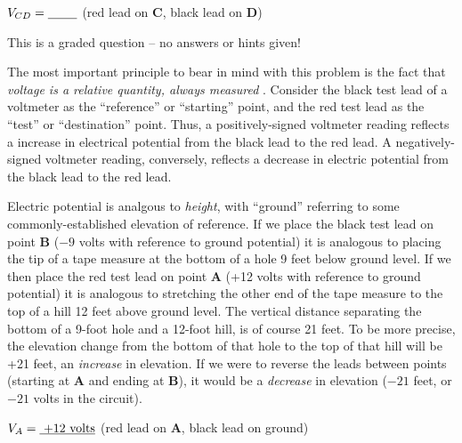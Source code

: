 \vskip 5pt

$V_{CD} = \hbox{\underbar{ \hskip 20pt}}$ (red lead on {\bf C}, black lead on {\bf D})

\vfil 

\eject






This is a graded question -- no answers or hints given!







The most important principle to bear in mind with this problem is the fact that {\it voltage is a relative quantity, always measured }.  Consider the black test lead of a voltmeter as the ``reference'' or ``starting'' point, and the red test lead as the ``test'' or ``destination'' point.  Thus, a positively-signed voltmeter reading reflects a increase in electrical potential from the black lead to the red lead.  A negatively-signed voltmeter reading, conversely, reflects a decrease in electric potential from the black lead to the red lead.

\vskip 10pt

Electric potential is analgous to {\it height}, with ``ground'' referring to some commonly-established elevation of reference.  If we place the black test lead on point {\bf B} ($-9$ volts with reference to ground potential) it is analogous to placing the tip of a tape measure at the bottom of a hole 9 feet below ground level.  If we then place the red test lead on point {\bf A} (+12 volts with reference to ground potential) it is analogous to stretching the other end of the tape measure to the top of a hill 12 feet above ground level.  The vertical distance separating the bottom of a 9-foot hole and a 12-foot hill, is of course 21 feet.  To be more precise, the elevation change from the bottom of that hole to the top of that hill will be +21 feet, an {\it increase} in elevation.  If we were to reverse the leads between points (starting at {\bf A} and ending at {\bf B}), it would be a {\it decrease} in elevation ($-21$ feet, or $-21$ volts in the circuit).

\vskip 10pt

$V_A = \hbox{\underbar{ +12 volts}}$ (red lead on {\bf A}, black lead on ground)

